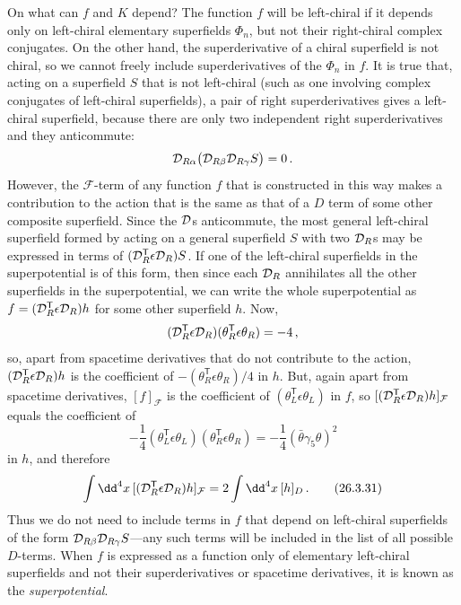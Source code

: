 On what can $f$ and $K$ depend? The function $f$ will be left-chiral if it
depends only on left-chiral elementary superfields $\Phi_n$, but not their
right-chiral complex conjugates. On the other hand, the superderivative of a
chiral superfield is not chiral, so we cannot freely include superderivatives
of the $\Phi_n$ in $f$. It is true that, acting on a superfield $S$ that is not
left-chiral (such as one involving complex conjugates of left-chiral
superfields), a pair of right superderivatives gives a left-chiral superfield,
because there are only two independent right superderivatives and they
anticommute:
\[
  \mathcal{D}_{R\alpha}
  \bigl(\mathcal{D}_{R\beta}\mathcal{D}_{R\gamma}S\bigr)=0\,.
\]
However, the $\mathcal{F}$-term of any function $f$ that is constructed in
this way makes a contribution to the action that is the same as that of a
$D$ term of some other composite superfield. Since the $\mathcal{D}$s
anticommute, the most general left-chiral superfield formed by acting on a
general superfield $S$ with two $\mathcal{D}_R$s may be expressed in terms of
$(\mathcal{D}_R^{\mathsf T}\epsilon\mathcal{D}_R)S$. If one of the left-chiral superfields in
the superpotential is of this form, then since each $\mathcal{D}_R$ annihilates
all the other superfields in the superpotential, we can write the whole
superpotential as $f=(\mathcal{D}_R^{\mathsf T}\epsilon\mathcal{D}_R)h$ for some other
superfield $h$. Now,
\[
  (\mathcal{D}_R^{\mathsf T}\epsilon\mathcal{D}_R)
  (\theta_R^{\mathsf T}\epsilon\theta_R)=-4\,,
\]
so, apart from spacetime derivatives that do not contribute to the action,
$(\mathcal{D}_R^{\mathsf T}\epsilon\mathcal{D}_R)h$ is the coefficient of
$-(\theta_R^{\mathsf T}\epsilon\theta_R)/4$ in $h$. But, again apart from spacetime
derivatives, $[f]_{\mathcal{F}}$ is the coefficient of
$(\theta_L^{\mathsf T}\epsilon\theta_L)$ in $f$, so
$[(\mathcal{D}_R^{\mathsf T}\epsilon\mathcal{D}_R)h]_{\mathcal{F}}$ equals the coefficient of
\[
  -\frac14(\theta_L^{\mathsf T}\epsilon\theta_L)
  (\theta_R^{\mathsf T}\epsilon\theta_R)
  =-\frac14(\bar\theta\gamma_5\theta)^2
\]
in $h$, and therefore
\begin{equation}
  \int \dd^4x\,
  [(\SuperD_R^{\mathsf T}\epsilon\SuperD_R)h]_{\mathcal{F}}
  =2\int \dd^4x\,[h]_D\,.
  \tag{26.3.31}\label{eq:26.3.31}
\end{equation}
Thus we do not need to include terms in $f$ that depend on left-chiral
superfields of the form $\mathcal{D}_{R\beta}\mathcal{D}_{R\gamma}S$---any such terms
will be included in the list of all possible $D$-terms. When $f$ is expressed
as a function only of elementary left-chiral superfields and not their
superderivatives or spacetime derivatives, it is known as the
\emph{superpotential}.

